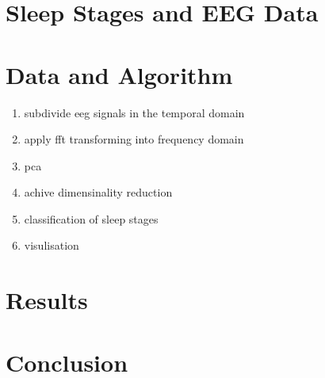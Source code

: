 \documentclass[a4paper]{IEEEtran}
\begin{document}
\section{Sleep Stages and EEG Data}

\section{Data and Algorithm}
\begin{enumerate}
	\item subdivide eeg signals in the temporal domain
	\item apply fft transforming into frequency domain
	\item pca
	\item achive dimensinality reduction
	\item classification of sleep stages
	\item visulisation
\end{enumerate}



\section{Results}

\section{Conclusion}




\end{document}
